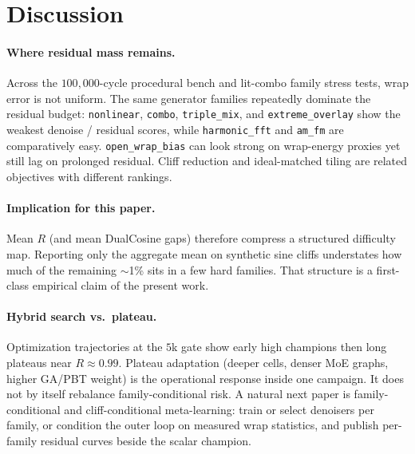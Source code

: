 \section{Discussion}
\label{sec:discussion}

\paragraph{Where residual mass remains.}
Across the $100{,}000$-cycle procedural bench and lit-combo family stress tests, wrap error is not uniform.
The same generator families repeatedly dominate the residual budget: \texttt{nonlinear}, \texttt{combo}, \texttt{triple\_mix}, and \texttt{extreme\_overlay} show the weakest denoise / residual scores, while \texttt{harmonic\_fft} and \texttt{am\_fm} are comparatively easy.
\texttt{open\_wrap\_bias} can look strong on wrap-energy proxies yet still lag on prolonged residual. Cliff reduction and ideal-matched tiling are related objectives with different rankings.

\paragraph{Implication for this paper.}
Mean $R$ (and mean DualCosine gaps) therefore compress a structured difficulty map.
Reporting only the aggregate mean on synthetic sine cliffs understates how much of the remaining $\sim$1\% sits in a few hard families.
That structure is a first-class empirical claim of the present work.

\paragraph{Hybrid search vs.\ plateau.}
Optimization trajectories at the $5$k gate show early high champions then long plateaus near $R\approx 0.99$.
Plateau adaptation (deeper cells, denser MoE graphs, higher GA/PBT weight) is the operational response inside one campaign. It does not by itself rebalance family-conditional risk.
A natural next paper is family-conditional and cliff-conditional meta-learning: train or select denoisers per family, or condition the outer loop on measured wrap statistics, and publish per-family residual curves beside the scalar champion.

